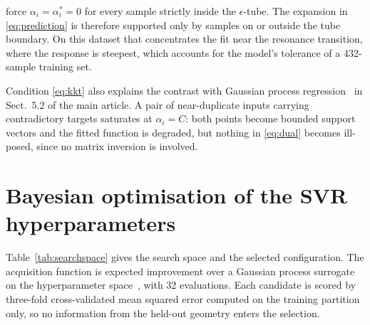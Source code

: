\documentclass[pdflatex,sn-basic,Numbered]{sn-jnl}
\begin{document}
force $\alpha_i = \alpha_i^{*} = 0$ for every sample strictly inside the
$\epsilon$-tube. The expansion in \eqref{eq:prediction} is therefore supported
only by samples on or outside the tube boundary. On this dataset that
concentrates the fit near the resonance transition, where the response is
steepest, which accounts for the model's tolerance of a 432-sample training
set.

Condition \eqref{eq:kkt} also explains the contrast with Gaussian process
regression~\cite{rasmussen2006} in Sect.~5.2 of the main article. A pair of near-duplicate inputs
carrying contradictory targets saturates at $\alpha_i = C$: both points become
bounded support vectors and the fitted function is degraded, but nothing in
\eqref{eq:dual} becomes ill-posed, since no matrix inversion is involved.

\section{Bayesian optimisation of the SVR hyperparameters}\label{sup:bayes}

Table~\ref{tab:searchspace} gives the search space and the selected
configuration. The acquisition function is expected improvement over a Gaussian
process surrogate on the hyperparameter space~\cite{snoek2012}, with 32
evaluations. Each
candidate is scored by three-fold cross-validated mean squared error computed on
the training partition only, so no information from the held-out geometry enters
the selection.
\end{document}
